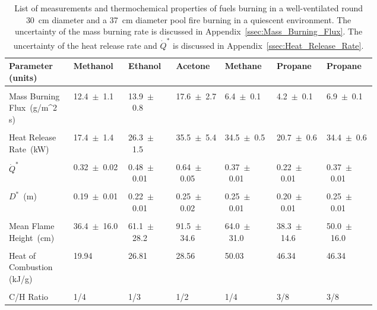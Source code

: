 \documentclass[12pt]{article}
\begin{document}
\begin{table}[!t]
\caption[List of measurements and thermochemical properties of fuels]{List of measurements and thermochemical properties of fuels burning in a well-ventilated round 30~cm diameter and a 37~cm diameter pool fire burning in a quiescent environment. The uncertainty of the mass burning rate is discussed in Appendix~\ref{ssec:Mass_Burning_Flux}. The uncertainty of the heat release rate and $\dot{Q}^*$ is discussed in Appendix~\ref{ssec:Heat_Release_Rate}.}
\label{tab:Pool_Fire_Parameters_Table}
\centering
	\footnotesize
	\begin{tabular}{p{0.125\linewidth}p{0.1\linewidth}p{0.1\linewidth}p{0.1\linewidth}p{0.1\linewidth}p{0.1\linewidth}p{0.1\linewidth}}
\hline
\textbf{Parameter (units)} &\textbf{Methanol}& \textbf{Ethanol}& \textbf{Acetone}&\textbf{Methane}&\textbf{Propane}&\textbf{Propane}\\
\hline
\\[0.01cm]
Mass Burning Flux~(\si{g/{m^2 s}})	&	12.4~$\pm$~1.1		&	13.9~$\pm$~0.8		&	17.6~$\pm$~2.7		&	6.4~$\pm$~0.1	&4.2~$\pm$~0.1		& 6.9~$\pm$~0.1\\
\\[0.01cm]
Heat Release Rate~(\si{kW})		&	17.4~$\pm$~1.4		&	26.3~$\pm$~1.5		&	35.5~$\pm$~5.4		&	34.5~$\pm$~0.5	&20.7~$\pm$~0.6  	& 34.4~$\pm$~0.6\\
\\[0.01cm]							
$\dot{Q}^* $				&	0.32~$\pm$~0.02		&	0.48~$\pm$~0.01		&	0.64~$\pm$~0.05		&	0.37~$\pm$~0.01	&0.22~$\pm$~0.01	& 0.37~$\pm$~0.01\\	
\\[0.01cm]
$D^*$~(\si{m})				&	0.19~$\pm$~0.01		&	0.22~$\pm$~0.01		&	0.25~$\pm$~0.02		& 	0.25~$\pm$~0.01	&0.20~$\pm$~0.01 	& 0.25~$\pm$~0.01\\
\\[0.01cm]
Mean Flame Height~(\si{cm})		&	36.4~$\pm$~16.0		&	61.1~$\pm$~28.2		&	91.5~$\pm$~34.6		&	64.0~$\pm$~31.0	&	38.3~$\pm$~14.6	& 50.0~$\pm$~16.0\\
\\[0.01cm]
Heat of Combustion (kJ/g)~\cite{SFPE}	&	19.94				&	26.81				&	28.56				&	50.03			&	46.34			& 46.34	\\	
\\[0.01cm]
C/H Ratio					&	1/4				&	1/3				&	1/2				&	1/4			&	3/8			& 3/8\\
\hline
\end{tabular}
\end{table}
\end{document}
